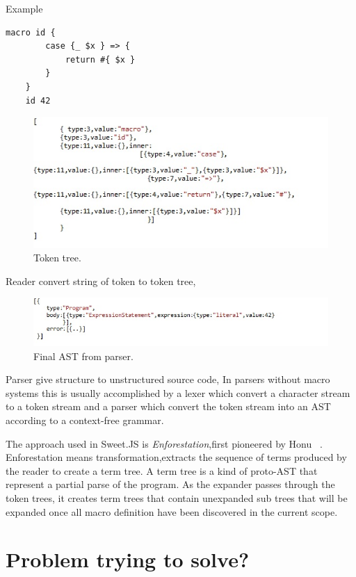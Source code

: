 Example

\begin{lstlisting}[frame=single]
	macro id {
  		case {_ $x } => {
   			return #{ $x }
  		}
	}
	id 42
\end{lstlisting}
\newpage
\begin{figure}[htb]
\centering
\includegraphics[width=1.0\textwidth]{images/readeroutput.jpg}
\caption{Token tree.} 
\label{fig:readeroutput}
\end{figure}
Reader convert string of token to token tree, 
\begin{figure}[htb]
\centering
\includegraphics[width=1.0\textwidth]{images/AST.jpg}
\caption{Final AST from parser.} 
\label{fig:AST}

\end{figure}

Parser give structure to unstructured source code, In parsers without macro systems this is usually accomplished by a lexer which convert a character stream to a token stream and a parser which convert the token stream into an AST according to a context-free grammar.

The approach used in Sweet.JS is \textit{Enforestation},first pioneered by Honu ~\cite{bib4}. Enforestation means transformation,extracts the sequence of terms produced by the reader to create a term tree. A term tree is a kind of proto-AST that represent a partial parse of the program. As the expander passes through the token trees, it creates term trees that contain unexpanded sub trees that will be expanded once all macro definition have been discovered in the current scope.

\section{Problem trying to solve?}

